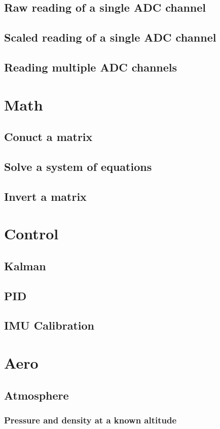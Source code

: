 \documentclass[10pt,letterpaper]{memoir} %
\begin{document}
\section{Raw reading of a single ADC channel}
\section{Scaled reading of a single ADC channel}
\section{Reading multiple ADC channels}

\chapter{Math}
\section{Conuct a matrix}
\section{Solve a system of equations}
\section{Invert a matrix}

\chapter{Control}
\section{Kalman}
\section{PID}
\section{IMU Calibration}

\chapter{Aero}
\section{Atmosphere}
\subsection{Pressure and density at a known altitude}
\end{document}

